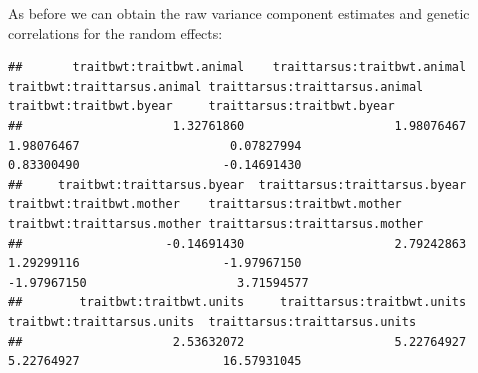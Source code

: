 \documentclass[
  12pt,
]{book}
\newenvironment{Shaded}{\begin{snugshade}}{\end{snugshade}}
\newcommand{\FloatTok}[1]{\textcolor[rgb]{0.00,0.00,0.81}{#1}}
\newcommand{\FunctionTok}[1]{\textcolor[rgb]{0.00,0.00,0.00}{#1}}
\newcommand{\NormalTok}[1]{#1}
\newcommand{\OtherTok}[1]{\textcolor[rgb]{0.56,0.35,0.01}{#1}}
\newcommand{\SpecialCharTok}[1]{\textcolor[rgb]{0.00,0.00,0.00}{#1}}
\newcommand{\StringTok}[1]{\textcolor[rgb]{0.31,0.60,0.02}{#1}}
\begin{document}
As before we can obtain the raw variance component estimates and genetic correlations for the random effects:

\begin{Shaded}
\end{Shaded}

\begin{verbatim}
##       traitbwt:traitbwt.animal    traittarsus:traitbwt.animal    traitbwt:traittarsus.animal traittarsus:traittarsus.animal        traitbwt:traitbwt.byear     traittarsus:traitbwt.byear 
##                     1.32761860                     1.98076467                     1.98076467                     0.07827994                     0.83300490                    -0.14691430 
##     traitbwt:traittarsus.byear  traittarsus:traittarsus.byear       traitbwt:traitbwt.mother    traittarsus:traitbwt.mother    traitbwt:traittarsus.mother traittarsus:traittarsus.mother 
##                    -0.14691430                     2.79242863                     1.29299116                    -1.97967150                    -1.97967150                     3.71594577 
##        traitbwt:traitbwt.units     traittarsus:traitbwt.units     traitbwt:traittarsus.units  traittarsus:traittarsus.units 
##                     2.53632072                     5.22764927                     5.22764927                    16.57931045
\end{verbatim}

\begin{Shaded}
\end{Shaded}
\end{document}
